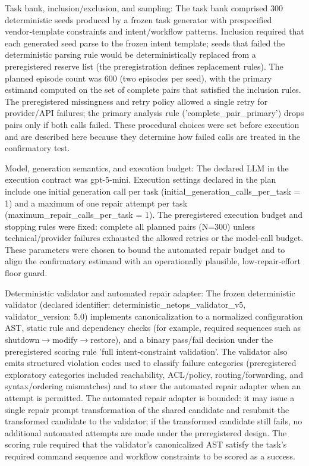 \documentclass[conference]{IEEEtran}
\begin{document}
Task bank, inclusion/exclusion, and sampling: The task bank comprised 300 deterministic seeds produced by a frozen task generator with prespecified vendor‑template constraints and intent/workflow patterns. Inclusion required that each generated seed parse to the frozen intent template; seeds that failed the deterministic parsing rule would be deterministically replaced from a preregistered reserve list (the preregistration defines replacement rules). The planned episode count was 600 (two episodes per seed), with the primary estimand computed on the set of complete pairs that satisfied the inclusion rules. The preregistered missingness and retry policy allowed a single retry for provider/API failures; the primary analysis rule ('complete\_pair\_primary') drops pairs only if both calls failed. These procedural choices were set before execution and are described here because they determine how failed calls are treated in the confirmatory test.

Model, generation semantics, and execution budget: The declared LLM in the execution contract was gpt-5-mini. Execution settings declared in the plan include one initial generation call per task (initial\_generation\_calls\_per\_task = 1) and a maximum of one repair attempt per task (maximum\_repair\_calls\_per\_task = 1). The preregistered execution budget and stopping rules were fixed: complete all planned pairs (N=300) unless technical/provider failures exhausted the allowed retries or the model‑call budget. These parameters were chosen to bound the automated repair budget and to align the confirmatory estimand with an operationally plausible, low‑repair‑effort floor guard.

Deterministic validator and automated repair adapter: The frozen deterministic validator (declared identifier: deterministic\_netops\_validator\_v5, validator\_version: 5.0) implements canonicalization to a normalized configuration AST, static rule and dependency checks (for example, required sequences such as shutdown\ensuremath{\rightarrow}modify\ensuremath{\rightarrow}restore), and a binary pass/fail decision under the preregistered scoring rule 'full intent‑constraint validation'. The validator also emits structured violation codes used to classify failure categories (preregistered exploratory categories included reachability, ACL/policy, routing/forwarding, and syntax/ordering mismatches) and to steer the automated repair adapter when an attempt is permitted. The automated repair adapter is bounded: it may issue a single repair prompt transformation of the shared candidate and resubmit the transformed candidate to the validator; if the transformed candidate still fails, no additional automated attempts are made under the preregistered design. The scoring rule required that the validator's canonicalized AST satisfy the task's required command sequence and workflow constraints to be scored as a success.
\end{document}
